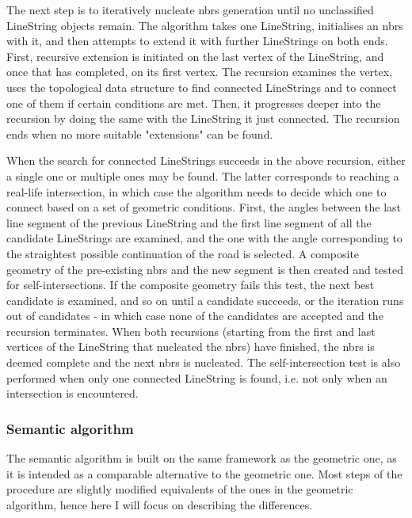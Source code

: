 The next step is to iteratively nucleate \ac{nbrs} generation until no unclassified LineString objects remain. The algorithm takes one LineString, initialises an \ac{nbrs} with it, and then attempts to extend it with further LineStrings on both ends. First, recursive extension is initiated on the last vertex of the LineString, and once that has completed, on its first vertex. The recursion examines the vertex, uses the topological data structure to find connected LineStrings and to connect one of them if certain conditions are met. Then, it progresses deeper into the recursion by doing the same with the LineString it just connected. The recursion ends when no more suitable "extensions" can be found.

When the search for connected LineStrings succeeds in the above recursion, either a single one or multiple ones may be found. The latter corresponds to reaching a real-life intersection, in which case the algorithm needs to decide which one to connect based on a set of geometric conditions. First, the angles between the last line segment of the previous LineString and the first line segment of all the candidate LineStrings are examined, and the one with the angle corresponding to the straightest possible continuation of the road is selected. A composite geometry of the pre-existing \ac{nbrs} and the new segment is then created and tested for self-intersections. If the composite geometry fails this test, the next best candidate is examined, and so on until a candidate succeeds, or the iteration runs out of candidates - in which case none of the candidates are accepted and the recursion terminates. When both recursions (starting from the first and last vertices of the LineString that nucleated the \ac{nbrs}) have finished, the \ac{nbrs} is deemed complete and the next \ac{nbrs} is nucleated. The self-intersection test is also performed when only one connected LineString is found, i.e. not only when an intersection is encountered.

\subsubsection{Semantic algorithm}

The semantic algorithm is built on the same framework as the geometric one, as it is intended as a comparable alternative to the geometric one. Most steps of the procedure are slightly modified equivalents of the ones in the geometric algorithm, hence here I will focus on describing the differences.

